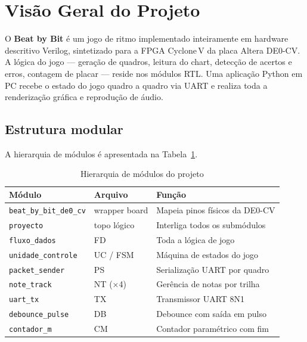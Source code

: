 \documentclass[12pt, a4paper]{article}
\begin{document}
\tableofcontents
\newpage

\section{Visão Geral do Projeto}

O \textbf{Beat by Bit} é um jogo de ritmo implementado inteiramente em hardware
descritivo Verilog, sintetizado para a FPGA Cyclone\,V da placa Altera DE0-CV.
A lógica do jogo — geração de quadros, leitura do chart, detecção de acertos e
erros, contagem de placar — reside nos módulos RTL. Uma aplicação Python em
PC recebe o estado do jogo quadro a quadro via UART e realiza toda a
renderização gráfica e reprodução de áudio.

\subsection{Estrutura modular}

A hierarquia de módulos é apresentada na Tabela~\ref{tab:hierarquia}.

\begin{table}[h!]
\centering
\caption{Hierarquia de módulos do projeto}
\label{tab:hierarquia}
\begin{tabularx}{\linewidth}{llX}
\toprule
\textbf{Módulo} & \textbf{Arquivo} & \textbf{Função} \\
\midrule
\texttt{beat\_by\_bit\_de0\_cv} & wrapper board & Mapeia pinos físicos da DE0-CV \\
\texttt{proyecto}               & topo lógico   & Interliga todos os submódulos \\
\texttt{fluxo\_dados}           & FD            & Toda a lógica de jogo \\
\texttt{unidade\_controle}      & UC / FSM      & Máquina de estados do jogo \\
\texttt{packet\_sender}         & PS            & Serialização UART por quadro \\
\texttt{note\_track}            & NT (×4)       & Gerência de notas por trilha \\
\texttt{uart\_tx}               & TX            & Transmissor UART 8N1 \\
\texttt{debounce\_pulse}        & DB            & Debounce com saída em pulso \\
\texttt{contador\_m}            & CM            & Contador paramétrico com fim \\
\bottomrule
\end{tabularx}
\end{table}
\end{document}
